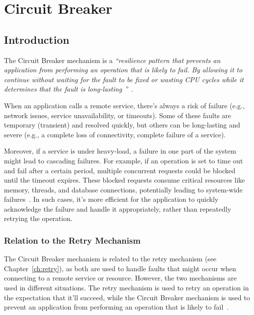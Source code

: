 \chapter{Circuit Breaker}\label{ch:circuit-breaker}



\section{Introduction}\label{sec:cbreaker-introduction}

The Circuit Breaker mechanism is a \textit{\enquote{resilience pattern
that prevents an application from performing an operation that is likely to fail.
By allowing it
to continue
without waiting for the fault to be fixed or wasting CPU cycles while it determines that the fault is long-lasting
}}~\cite{microsoft-cbreaker-pattern}.

When an application calls a remote service, there's always a risk of failure
(e.g., network issues, service unavailability, or timeouts).
Some of these faults are temporary (transient) and resolved quickly,
but others can be long-lasting and severe (e.g., a complete loss of connectivity, complete failure of a service).

Moreover, if a service is under heavy-load, a failure in one part of the system might lead to cascading failures.
For example, if an operation is set to time out and fail after a certain period, multiple concurrent requests could be blocked until the timeout expires.
These blocked requests consume critical resources like memory, threads, and database connections, potentially leading to system-wide failures~\cite{microsoft-cbreaker-pattern}.
In such cases, it’s more efficient for the application to quickly acknowledge the failure and handle it appropriately, rather than repeatedly retrying the operation.

\subsection{Relation to the Retry Mechanism}\label{subsec:cbreaker-relation-to-retry}

The Circuit Breaker mechanism is related to the retry mechanism (see Chapter~\ref{ch:retry}), as both are used to handle faults that might occur when connecting to a remote service or resource.
However, the two mechanisms are used in different situations.
The retry mechanism is used to retry an operation in the expectation that it'll succeed, while the Circuit Breaker mechanism is used to prevent an application from performing an operation that is likely to fail~\cite{microsoft-cbreaker-pattern}.

